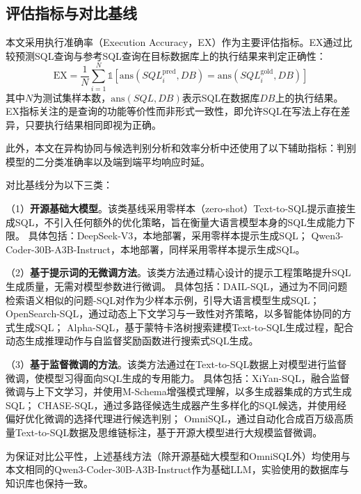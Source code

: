 \subsection{评估指标与对比基线}



本文采用执行准确率（Execution Accuracy，EX）作为主要评估指标。EX通过比较预测SQL查询与参考SQL查询在目标数据库上的执行结果来判定正确性：
\begin{equation}
\text{EX} = \frac{1}{N} \sum_{i=1}^{N} \mathbb{1}[\text{ans}(SQL_i^{\text{pred}}, DB) = \text{ans}(SQL_i^{\text{gold}}, DB)]
\end{equation}
其中$N$为测试集样本数，$\text{ans}(SQL, DB)$表示SQL在数据库$DB$上的执行结果。EX指标关注的是查询的功能等价性而非形式一致性，即允许SQL在写法上存在差异，只要执行结果相同即视为正确。

此外，本文在异构协同与候选判别分析和效率分析中还使用了以下辅助指标：判别模型的二分类准确率以及端到端平均响应时延。

对比基线分为以下三类：

（1）\textbf{开源基础大模型}。该类基线采用零样本（zero-shot）Text-to-SQL提示直接生成SQL，不引入任何额外的优化策略，旨在衡量大语言模型本身的SQL生成能力下限。
具体包括：DeepSeek-V3\cite{deepseek2024}，本地部署，采用零样本提示生成SQL；
Qwen3-Coder-30B-A3B-Instruct\cite{qwen32024}，本地部署，同样采用零样本提示生成SQL。

（2）\textbf{基于提示词的无微调方法}。该类方法通过精心设计的提示工程策略提升SQL生成质量，无需对模型参数进行微调。
具体包括：DAIL-SQL\cite{gao2024text2sql}，通过为不同问题检索语义相似的问题-SQL对作为少样本示例，引导大语言模型生成SQL；
OpenSearch-SQL\cite{xie2025opensearch}，通过动态上下文学习与一致性对齐策略，以多智能体协同的方式生成SQL；
Alpha-SQL\cite{li2025alpha}，基于蒙特卡洛树搜索建模Text-to-SQL生成过程，配合动态生成推理动作与自监督奖励函数进行搜索式SQL生成。

（3）\textbf{基于监督微调的方法}。该类方法通过在Text-to-SQL数据上对模型进行监督微调，使模型习得面向SQL生成的专用能力。
具体包括：XiYan-SQL\cite{gao2024xiyan}，融合监督微调与上下文学习，并使用M-Schema增强模式理解，以多生成器集成的方式生成SQL；
CHASE-SQL\cite{pourreza2024chase}，通过多路径候选生成器产生多样化的SQL候选，并使用经偏好优化微调的选择代理进行候选判别；
OmniSQL\cite{li2025omnisql}，通过自动化合成百万级高质量Text-to-SQL数据及思维链标注，基于开源大模型进行大规模监督微调。

为保证对比公平性，上述基线方法（除开源基础大模型和OmniSQL外）均使用与本文相同的Qwen3-Coder-30B-A3B-Instruct作为基础LLM，实验使用的数据库与知识库也保持一致。

